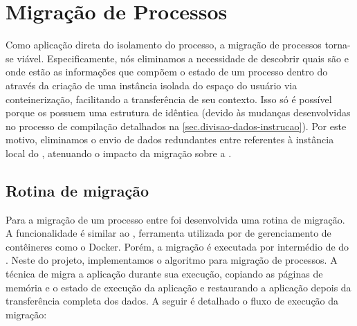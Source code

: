 
\section{Migração de Processos}
\label{sec.migracao}

Como aplicação direta do isolamento do processo, a migração de processos torna-se viável. Especificamente, nós eliminamos a necessidade de descobrir quais são e onde estão as informações que compõem o estado de um processo dentro do \nanvix através da criação de uma instância isolada do espaço do usuário via conteinerização, facilitando a transferência de seu contexto. Isso só é possível porque os \clusters possuem uma estrutura de  idêntica (devido às mudanças desenvolvidas no processo de compilação detalhados na \autoref{sec.divisao-dados-instrucao}). Por este motivo, eliminamos o envio de dados redundantes entre \clusters referentes à instância local do \os, atenuando o impacto da migração sobre a \noc.

\subsection{Rotina de migração}
\label{sec.rotina-migracao}

Para a migração de um processo entre \clusters foi desenvolvida uma rotina de migração. A funcionalidade é similar ao \criu, ferramenta utilizada por \softwares de gerenciamento de contêineres como o Docker. Porém, a migração é executada por intermédio de \daemons do \os. Neste do projeto, implementamos o algoritmo \hotmigration para migração de processos. A técnica de \hotmigration migra a aplicação durante sua execução, copiando as páginas de memória e o estado de execução da aplicação e restaurando a aplicação depois da transferência completa dos dados. A seguir é detalhado o fluxo de execução da migração:

